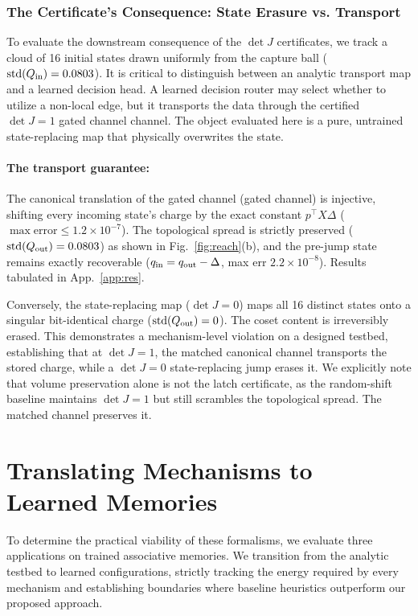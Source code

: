 \documentclass{article}
\newcommand{\detJ}{\det J}
\begin{document}
\subsubsection{The Certificate's Consequence: State Erasure vs. Transport}
\label{sec:erasure}
To evaluate the downstream consequence of the $\detJ$ certificates, we track a cloud of 16 initial states drawn uniformly from the capture ball ($\mathrm{std}(Q_{\rm in})=0.0803$). It is critical to distinguish between an analytic transport map and a learned decision head. A learned decision router may select whether to utilize a non-local edge, but it transports the data through the certified $\detJ=1$ gated channel channel. The object evaluated here is a pure, untrained state-replacing map that physically overwrites the state.

\paragraph{The transport guarantee:}
The canonical translation of the gated channel (gated channel) is injective, shifting every incoming state's charge by the exact constant $p^\top X\Delta$ ($\max\text{error}\le1.2\times10^{-7}$). The topological spread is strictly preserved ($\mathrm{std}(Q_{\rm out})=0.0803$) as shown in Fig.~\ref{fig:reach}(b), and the pre-jump state remains exactly recoverable  ($q_{\rm in}=q_{\rm out}-\Delta$, max err $2.2{\times}10^{-8}$). Results tabulated in App.~\ref{app:res}.

Conversely, the state-replacing map ($\detJ=0$) maps all 16 distinct states onto a singular bit-identical charge ($\mathrm{std}(Q_{\rm out})=0$). The coset content is irreversibly erased. This demonstrates a mechanism-level violation on a designed testbed, establishing that at $\detJ=1$, the matched canonical channel transports the stored charge, while a $\detJ=0$ state-replacing jump erases it. We explicitly note that volume preservation alone is not the latch certificate, as the random-shift baseline maintains $\detJ=1$ but still scrambles the topological spread. The matched channel preserves it.

\section{Translating Mechanisms to Learned Memories}
To determine the practical viability of these formalisms, we evaluate three applications on trained associative memories. We transition from the analytic testbed to learned configurations, strictly tracking the energy required by every mechanism and establishing boundaries where baseline heuristics outperform our proposed approach.
\end{document}
